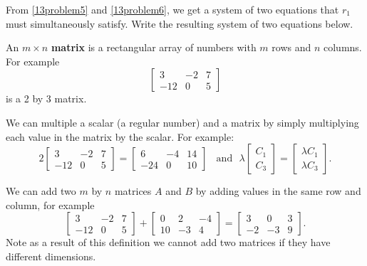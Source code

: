 \ii From \ref{13problem5} and \ref{13problem6}, we get a system of two equations that $r_1$ must simultaneously satisfy. Write the resulting system of two equations below.\label{13problem7}

\vspace{0.75in}

\ee



\clearpage


An $m \times n$ \textbf{matrix} is a rectangular array of numbers with $m$ rows and $n$ columns. For example
\[ \left[ \begin{array}{ccc} 3 & -2 & 7 \\ -12 & 0 & 5 \end{array} \right] \]
is a 2 by 3 matrix.

We can multiple a scalar (a regular number) and a matrix by simply multiplying each value in the matrix by the scalar. For example:
\[  2 \left[ \begin{array}{ccc} 3 & -2 & 7 \\ -12 & 0 & 5 \end{array} \right] = \left[ \begin{array}{ccc} 6 & -4 & 14 \\ -24 & 0 & 10 \end{array} \right] \ \ \ \ \mbox{and} \ \ \
\lambda  \left[ \begin{array}{c} C_1 \\ C_3   \end{array} \right] =  \left[ \begin{array}{c} \lambda C_1 \\ \lambda C_3   \end{array} \right]. \] 

We can add two $m$ by $n$ matrices $A$ and $B$ by adding values in the same row and column, for example
\[ \left[ \begin{array}{ccc} 3 & -2 & 7 \\ -12 & 0 & 5 \end{array} \right] + \left[ \begin{array}{ccc} 0 & 2 & -4 \\ 10 & -3 & 4 \end{array} \right]
=  \left[ \begin{array}{ccc} 3 & 0 & 3 \\ -2 & -3 & 9 \end{array} \right]. \]
Note as a result of this definition we cannot add two matrices if they have different dimensions.

